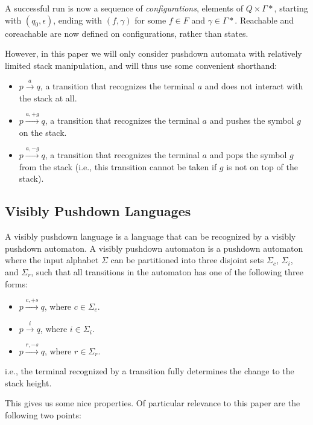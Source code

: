 \documentclass[sigplan]{acmart}\settopmatter{printfolios=true,printccs=false,printacmref=false}
\begin{document}
\noindent A successful run is now a sequence of \emph{configurations}, elements of $Q \times \Gamma*$, starting with $(q_0, \epsilon)$, ending with $(f, \gamma)$ for some $f \in F$ and $\gamma \in \Gamma*$. Reachable and coreachable are now defined on configurations, rather than states.

However, in this paper we will only consider pushdown automata with relatively limited stack manipulation, and will thus use some convenient shorthand:

\begin{itemize}
\item $p \xrightarrow{a} q$, a transition that recognizes the terminal $a$ and does not interact with the stack at all.
\item $p \xrightarrow{a, +g} q$, a transition that recognizes the terminal $a$ and pushes the symbol $g$ on the stack.
\item $p \xrightarrow{a, -g} q$, a transition that recognizes the terminal $a$ and pops the symbol $g$ from the stack (i.e., this transition cannot be taken if $g$ is not on top of the stack).
\end{itemize}

\subsection{Visibly Pushdown Languages}

A visibly pushdown language \cite{alurVisiblyPushdownLanguages2004} is a language that can be recognized by a visibly pushdown automaton. A visibly pushdown automaton is a pushdown automaton where the input alphabet $\Sigma$ can be partitioned into three disjoint sets $\Sigma_c$, $\Sigma_i$, and $\Sigma_r$, such that all transitions in the automaton has one of the following three forms:

\begin{itemize}
\item $p \xrightarrow{c, +s} q$, where $c \in \Sigma_c$.
\item $p \xrightarrow{i} q$, where $i \in \Sigma_i$.
\item $p \xrightarrow{r, -s} q$, where $r \in \Sigma_r$.
\end{itemize}

\noindent i.e., the terminal recognized by a transition fully determines the change to the stack height.

This gives us some nice properties. Of particular relevance to this paper are the following two points:
\end{document}
